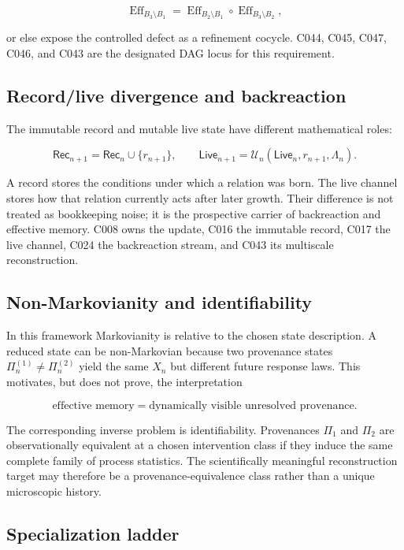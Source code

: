 \[
\operatorname{Eff}_{B_3\setminus B_1}
=
\operatorname{Eff}_{B_2\setminus B_1}
\circ
\operatorname{Eff}_{B_3\setminus B_2},
\]

or else expose the controlled defect as a refinement cocycle. C044,
C045, C047, C046, and C043 are the designated DAG locus for this
requirement.

\subsection{Record/live divergence and
backreaction}\label{recordlive-divergence-and-backreaction}

The immutable record and mutable live state have different mathematical
roles:

\[
\mathsf{Rec}_{n+1}=\mathsf{Rec}_n\cup\{r_{n+1}\},
\qquad
\mathsf{Live}_{n+1}=\mathcal U_n(\mathsf{Live}_n,r_{n+1},\Lambda_n).
\]

A record stores the conditions under which a relation was born. The live
channel stores how that relation currently acts after later growth.
Their difference is not treated as bookkeeping noise; it is the
prospective carrier of backreaction and effective memory. C008 owns the
update, C016 the immutable record, C017 the live channel, C024 the
backreaction stream, and C043 its multiscale reconstruction.

\subsection{Non-Markovianity and
identifiability}\label{non-markovianity-and-identifiability}

In this framework Markovianity is relative to the chosen state
description. A reduced state can be non-Markovian because two provenance
states \(\Pi_n^{(1)}\ne\Pi_n^{(2)}\) yield the same \(X_n\) but
different future response laws. This motivates, but does not prove, the
interpretation

\[
\text{effective memory}
=
\text{dynamically visible unresolved provenance}.
\]

The corresponding inverse problem is identifiability. Provenances
\(\Pi_1\) and \(\Pi_2\) are observationally equivalent at a chosen
intervention class if they induce the same complete family of process
statistics. The scientifically meaningful reconstruction target may
therefore be a provenance-equivalence class rather than a unique
microscopic history.

\subsection{Specialization ladder}\label{specialization-ladder}

